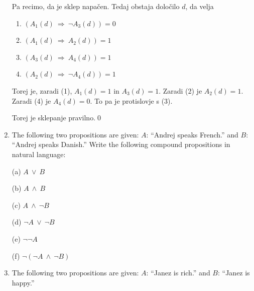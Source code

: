 \documentclass[11pt,paper=b5,footinclude,headinclude]{scrbook} %
\def\ali {{~\vee~}}
\def\inn {{~\wedge~}}
\def\sledi {{~\Rightarrow~}}
\begin{document}
\begin{enumerate}
Pa recimo, da je sklep napačen. Tedaj obstaja določilo $d$, da velja
\begin{enumerate}[(1)]
  \item $(A_1(d)\sledi \neg A_3(d)) = 0$
  \item $(A_1(d)\sledi A_2(d)) = 1$
  \item $(A_3(d)\sledi A_4(d)) = 1$
  \item $(A_2(d)\sledi \neg A_4(d)) = 1$
\end{enumerate}
Torej je, zaradi (1), $A_1(d) = 1$ in $A_3(d) = 1$. Zaradi (2) je $A_2(d) = 1$.
Zaradi (4) je $A_4(d) = 0$. To pa je protislovje s (3).

Torej je sklepanje pravilno.\qed


%
%
%
%
%
%
%
%
%
%
%
%
%
%
%
%
%
%
%
%
%
%
%
%
%
%
%


\item
The following two propositions are given:
$A$: ``Andrej speaks French.'' and $B$: ``Andrej speaks Danish.''
Write the following compound propositions in natural language:

(a) $A\ali B$

(b) $A\inn B$

(c) $A\inn \neg B$

(d) $\neg A\ali \neg B$

(e) $\neg \neg A$

(f) $\neg (\neg A\inn \neg B)$

\medskip
\item
The following two propositions are given:
$A$: ``Janez is rich.'' and $B$: ``Janez is happy.''


\end{enumerate}
\end{document}
